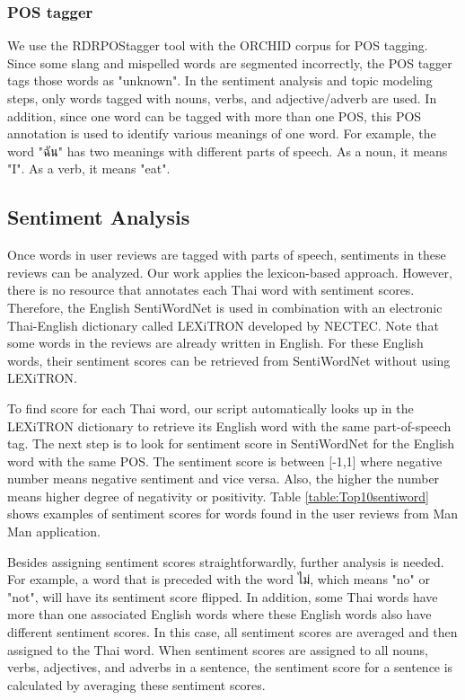 \subsubsection{POS tagger}

We use the RDRPOStagger tool\cite{RDRPOSTagger} with the ORCHID corpus\cite{ORCHID} for POS tagging. Since some slang and mispelled words are segmented incorrectly, the POS tagger tags those words as "unknown". In the sentiment analysis and topic modeling steps, only words tagged with nouns, verbs, and adjective/adverb are used. In addition, since one word can be tagged with more than one POS, this POS annotation is used to identify various meanings of one word. For example, the word "{ฉัน}" has two meanings with different parts of speech. As a noun, it means "I". As a verb, it means "eat".

\subsection{Sentiment Analysis}
Once words in user reviews are tagged with parts of speech, sentiments in these reviews can be analyzed. Our work applies the lexicon-based approach. However, there is no resource that annotates each Thai word with sentiment scores. Therefore, the English SentiWordNet \cite{SentiWordNet} is used in combination with an electronic Thai-English dictionary called LEXiTRON \cite{LEXiTRON} developed by NECTEC. Note that some words in the reviews are already written in English. For these English words, their sentiment scores can be retrieved from SentiWordNet without using LEXiTRON.

To find score for each Thai word, our script automatically looks up in the LEXiTRON dictionary to retrieve its English word with the same part-of-speech tag. The next step is to look for sentiment score in SentiWordNet for the English word with the same POS. The sentiment score is between [-1,1] where negative number means negative sentiment and vice versa. Also, the higher the number means higher degree of negativity or positivity. Table \ref{table:Top10sentiword} shows examples of sentiment scores for words found in the user reviews from Man Man application. 

Besides assigning sentiment scores straightforwardly, further analysis is needed. For example, 
a word that is preceded with the word {ไม่}, which means "no" or "not", will have its sentiment score flipped. In addition, some Thai words have more than one associated English words where these English words also have different sentiment scores. In this case, all sentiment scores are  averaged and then assigned to the Thai word. When sentiment scores are assigned to all nouns, verbs, adjectives, and adverbs in a sentence, the sentiment score for a sentence is calculated by averaging these sentiment scores.

